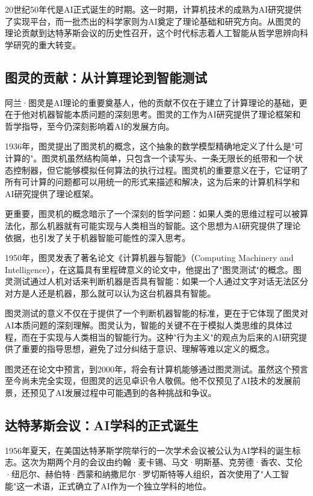 20世纪50年代是AI正式诞生的时期。这一时期，计算机技术的成熟为AI研究提供了实现平台，而一批杰出的科学家则为AI奠定了理论基础和研究方向。从图灵的理论贡献到达特茅斯会议的历史性召开，这个时代标志着人工智能从哲学思辨向科学研究的重大转变。

\subsection{图灵的贡献：从计算理论到智能测试}

阿兰·图灵是AI理论的重要奠基人，他的贡献不仅在于建立了计算理论的基础，更在于他对机器智能本质问题的深刻思考。图灵的工作为AI研究提供了理论框架和哲学指导，至今仍深刻影响着AI的发展方向。

1936年，图灵提出了图灵机的概念，这个抽象的数学模型精确地定义了什么是"可计算的"。图灵机虽然结构简单，只包含一个读写头、一条无限长的纸带和一个状态控制器，但它能够模拟任何算法的执行过程。图灵机的重要意义在于，它证明了所有可计算的问题都可以用统一的形式来描述和解决，这为后来的计算机科学和AI研究提供了理论框架。

更重要，图灵机的概念暗示了一个深刻的哲学问题：如果人类的思维过程可以被算法化，那么机器就有可能实现与人类相当的智能。这个思想为AI研究提供了理论依据，也引发了关于机器智能可能性的深入思考。

1950年，图灵发表了著名论文《计算机器与智能》（Computing Machinery and Intelligence），在这篇具有里程碑意义的论文中，他提出了"图灵测试"的概念。图灵测试通过人机对话来判断机器是否具有智能：如果一个人通过文字对话无法区分对方是人还是机器，那么就可以认为这台机器具有智能。

图灵测试的意义不仅在于提供了一个判断机器智能的标准，更在于它体现了图灵对AI本质问题的深刻理解。图灵认为，智能的关键不在于模拟人类思维的具体过程，而在于实现与人类相当的智能行为。这种"行为主义"的观点为后来的AI研究提供了重要的指导思想，避免了过分纠结于意识、理解等难以定义的概念。

图灵还在论文中预言，到2000年，将会有计算机能够通过图灵测试。虽然这个预言至今尚未完全实现，但图灵的远见卓识令人敬佩。他不仅预见了AI技术的发展前景，还预见了AI发展过程中可能遇到的各种挑战和争议。

\subsection{达特茅斯会议：AI学科的正式诞生}

1956年夏天，在美国达特茅斯学院举行的一次学术会议被公认为AI学科的诞生标志。这次为期两个月的会议由约翰·麦卡锡、马文·明斯基、克劳德·香农、艾伦·纽厄尔、赫伯特·西蒙和纳撒尼尔·罗切斯特等人组织，首次使用了"人工智能"这一术语，正式确立了AI作为一个独立学科的地位。

